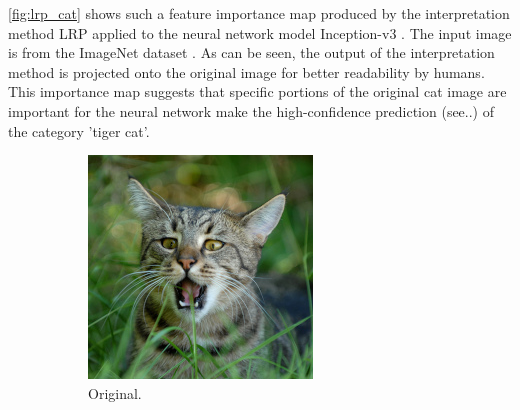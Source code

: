 \autoref{fig:lrp_cat} shows such a feature importance map produced by the interpretation method LRP \cite{bach2015pixel} applied to the neural network model Inception-v3 \cite{szegedy2016rethinking}. The input image is from the ImageNet dataset \cite{ILSVRC15}. As can be seen, the output of the interpretation method is projected onto the original image for better readability by humans. This importance map suggests that specific portions of the original cat image are important for the neural network make the high-confidence prediction (see..) of the category 'tiger cat'. 

\begin{figure}[ht]
    \centering
    \begin{subfigure}{0.48\linewidth}
      \includegraphics[width=\linewidth]{figures/cat.JPEG}
      \caption{Original.}
      \label{fig:lrp_cat_orig}
    \end{subfigure}
    \begin{subfigure}{0.48\linewidth}

\end{subfigure}
\end{figure}
